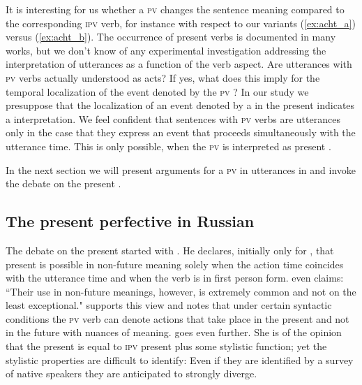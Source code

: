 \documentclass[output=paper,colorlinks,citecolor=brown,newtxmath,hidelinks]{langscibook}
\begin{document}
It is interesting for us whether a \textsc{pv}  changes the sentence meaning compared to the corresponding \textsc{ipv} verb, for instance with respect to our variants (\ref{ex:acht_a}) versus (\ref{ex:acht_b}). The occurrence of present   verbs is documented in many works, but we don't know of any experimental investigation addressing the interpretation of  utterances as a function of the verb aspect. Are utterances with \textsc{pv}  verbs actually understood as  acts? If yes, what does this imply for the temporal localization of the event denoted by the \textsc{pv} ? In our study we presuppose that the localization of an event denoted by a  in the present indicates a  interpretation. We feel confident that sentences with \textsc{pv}  verbs are  utterances only in the case that they express an event that proceeds simultaneously with the utterance time. This is only possible, when the \textsc{pv}  is interpreted as present .  

In the next section we will present arguments for a \textsc{pv} in  utterances in  and invoke the debate on the present .

\subsection{The present perfective in Russian}\label{sub:eins:4}

The debate on the present  started with \citet{Koschmieder1929}. He declares, initially only for , that present  is possible in non-future meaning solely when the action time coincides with the utterance time and when the verb is in first person form. \citet[120]{Forsyth1970} even claims: “Their use in non-future meanings, however, is extremely common and not on the least exceptional." \citet{Svedova1980} supports this view and notes that under certain syntactic conditions the \textsc{pv} verb can denote actions that take place in the present and not in the future with nuances of meaning. \citet{Rathmayr1976} goes even further. She is of the opinion that the present  is equal to \textsc{ipv} present plus some stylistic function; yet the stylistic properties are difficult to identify: Even if they are identified by a survey of native speakers they are anticipated to strongly diverge. 
\end{document}
